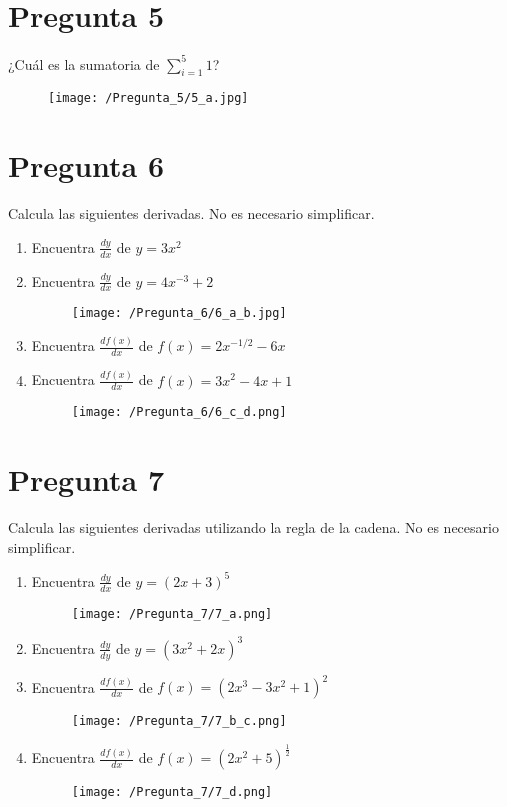 \documentclass[]{article}
\begin{document}
\section*{Pregunta 5}
¿Cuál es la sumatoria de $\sum_{i=1}^{5}1$?

\begin{figure}[H]
	\texttt{[image: /Pregunta\_5/5\_a.jpg]}
\end{figure}

\section*{Pregunta 6}
Calcula las siguientes derivadas. No es necesario simplificar.

\begin{enumerate}[label=(\alph*)]
	\item Encuentra $\frac{dy}{dx}$ de $y=3x^2$
	\item Encuentra $\frac{dy}{dx}$ de $y=4x^{-3}+2$
	\begin{figure}[H]
		\texttt{[image: /Pregunta\_6/6\_a\_b.jpg]}
	\end{figure}
	\item Encuentra $\frac{df(x)}{dx}$ de $f(x)=2x^{-1/2} - 6x$
	\item Encuentra $\frac{df(x)}{dx}$ de $f(x)=3x^2-4x+1$
	\begin{figure}[H]
	\texttt{[image: /Pregunta\_6/6\_c\_d.png]}
	\end{figure}
\end{enumerate}

\section*{Pregunta 7}
Calcula las siguientes derivadas utilizando la regla de la cadena. No es necesario simplificar.

\begin{enumerate}[label=\alph*]
	\item Encuentra $\frac{dy}{dx}$ de $y=(2x+3)^5$
	\begin{figure}[H]
		\texttt{[image: /Pregunta\_7/7\_a.png]}
	\end{figure}
	\item Encuentra $\frac{dy}{dy}$ de $y=(3x^2+2x)^3$
	\item Encuentra $\frac{df(x)}{dx}$ de $f(x)=(2x^3-3x^2+1)^2$
	\begin{figure}[H]
	\texttt{[image: /Pregunta\_7/7\_b\_c.png]}
	\end{figure}
	\item Encuentra $\frac{df(x)}{dx}$ de $f(x)=(2x^2+5)^{\frac{1}{2}}$ 
	\begin{figure}[H]
		\texttt{[image: /Pregunta\_7/7\_d.png]}
	\end{figure}
\end{enumerate}
\end{document}
